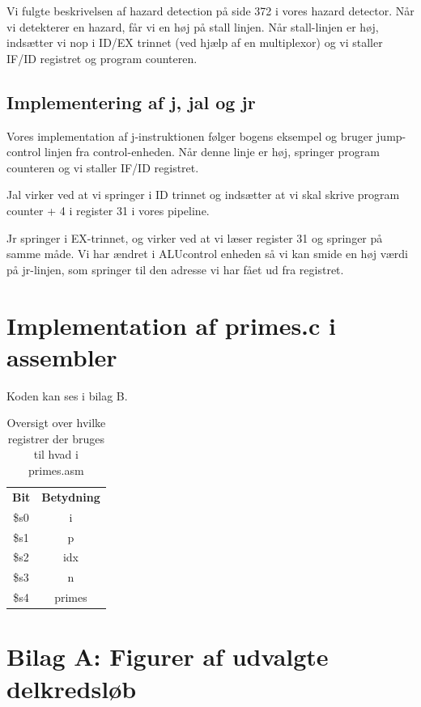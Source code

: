 \documentclass [10pt,a4paper]{article}
\begin{document}
Vi fulgte beskrivelsen af hazard detection på side 372 i vores
hazard detector. Når vi detekterer en hazard, får vi en høj på stall
linjen. Når stall-linjen er høj, indsætter vi nop i ID/EX trinnet (ved
hjælp af en multiplexor) og vi staller IF/ID registret og program
counteren.

\subsection{Implementering af j, jal og jr}

Vores implementation af j-instruktionen følger bogens eksempel og
bruger jump-control linjen fra control-enheden. Når denne linje er
høj, springer program counteren og vi staller IF/ID registret.

Jal virker ved at vi springer i ID trinnet og indsætter at vi skal
skrive program counter + 4 i register 31 i vores pipeline.

Jr springer i EX-trinnet, og virker ved at vi læser register 31 og
springer på samme måde. Vi har ændret i ALUcontrol enheden så vi kan
smide en høj værdi på jr-linjen, som springer til den adresse vi har
fået ud fra registret.

\section{Implementation af primes.c i assembler}

Koden kan ses i bilag B.

\begin{table}
  \caption{Oversigt over hvilke registrer der bruges til hvad i
    primes.asm}
  \centering
  \begin{tabular}{ c | c }
    \textbf{Bit} & \textbf{Betydning} \\
    \$s0 & i \\
    \$s1 & p \\
    \$s2 & idx \\
    \$s3 & n \\
    \$s4 & primes \\
  \end{tabular}
\end{table}

\clearpage

\section*{Bilag A: Figurer af udvalgte delkredsløb}
\end{document}
